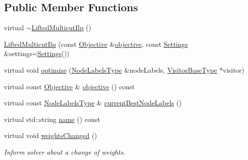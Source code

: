 \subsection*{Public Member Functions}
\begin{DoxyCompactItemize}
\item 
virtual \hyperlink{classnifty_1_1graph_1_1lifted__multicut_1_1LiftedMulticutIlp_abd3f0f67ab66073f5cecfe8724ab56e4}{$\sim$\+Lifted\+Multicut\+Ilp} ()
\item 
\hyperlink{classnifty_1_1graph_1_1lifted__multicut_1_1LiftedMulticutIlp_afea9d91a8f9d6570bf773cf6a2724307}{Lifted\+Multicut\+Ilp} (const \hyperlink{classnifty_1_1graph_1_1lifted__multicut_1_1LiftedMulticutIlp_a9e7a118481038bcb5b4f1a41edd05b39}{Objective} \&\hyperlink{classnifty_1_1graph_1_1lifted__multicut_1_1LiftedMulticutIlp_ae87c418362b292d18094e1b69af68f0a}{objective}, const \hyperlink{structnifty_1_1graph_1_1lifted__multicut_1_1LiftedMulticutIlp_1_1Settings}{Settings} \&settings=\hyperlink{structnifty_1_1graph_1_1lifted__multicut_1_1LiftedMulticutIlp_1_1Settings}{Settings}())
\item 
virtual void \hyperlink{classnifty_1_1graph_1_1lifted__multicut_1_1LiftedMulticutIlp_ad5afb2d98074e2c2ca1a5d9d03fb16fd}{optimize} (\hyperlink{classnifty_1_1graph_1_1lifted__multicut_1_1LiftedMulticutIlp_adc3cc80eb39cbab34f157892edbb8b51}{Node\+Labels\+Type} \&node\+Labels, \hyperlink{classnifty_1_1graph_1_1lifted__multicut_1_1LiftedMulticutIlp_a3d4b30d462387a88a2ca290c11112ed4}{Visitor\+Base\+Type} $\ast$visitor)
\item 
virtual const \hyperlink{classnifty_1_1graph_1_1lifted__multicut_1_1LiftedMulticutIlp_a9e7a118481038bcb5b4f1a41edd05b39}{Objective} \& \hyperlink{classnifty_1_1graph_1_1lifted__multicut_1_1LiftedMulticutIlp_ae87c418362b292d18094e1b69af68f0a}{objective} () const 
\item 
virtual const \hyperlink{classnifty_1_1graph_1_1lifted__multicut_1_1LiftedMulticutIlp_adc3cc80eb39cbab34f157892edbb8b51}{Node\+Labels\+Type} \& \hyperlink{classnifty_1_1graph_1_1lifted__multicut_1_1LiftedMulticutIlp_ab353963b0f5b994866f59cc34d3017ee}{current\+Best\+Node\+Labels} ()
\item 
virtual std\+::string \hyperlink{classnifty_1_1graph_1_1lifted__multicut_1_1LiftedMulticutIlp_a7324f336c92085c7d87c4f3f601302b6}{name} () const 
\item 
virtual void \hyperlink{classnifty_1_1graph_1_1lifted__multicut_1_1LiftedMulticutIlp_a3c1d526c0615ed8b1375044b1e30f4c1}{weights\+Changed} ()
\begin{DoxyCompactList}\small\item\em Inform solver about a change of weights. \end{DoxyCompactList}\end{DoxyCompactItemize}


